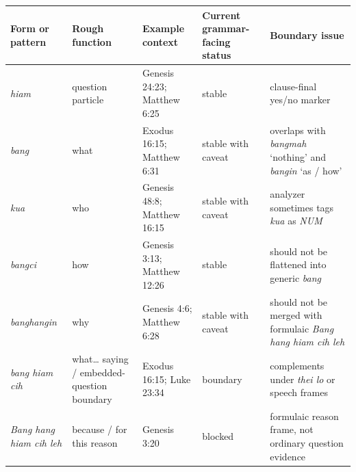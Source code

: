\documentclass[
  11pt,
  a4paper,
]{article}
\newcounter{none} %
\newcommand{\tdim}[1]{\textit{#1}}
\newcommand{\glossquote}[1]{`#1'}
\begin{document}
{\def\LTcaptype{none} %
\begin{longtable}[]{@{}
  >{\raggedright\arraybackslash}p{}
  >{\raggedright\arraybackslash}p{}
  >{\raggedright\arraybackslash}p{}
  >{\raggedright\arraybackslash}p{}
  >{\raggedright\arraybackslash}p{}@{}}
\toprule\noalign{}
\begin{minipage}[b]{\linewidth}\raggedright
Form or pattern
\end{minipage} & \begin{minipage}[b]{\linewidth}\raggedright
Rough function
\end{minipage} & \begin{minipage}[b]{\linewidth}\raggedright
Example context
\end{minipage} & \begin{minipage}[b]{\linewidth}\raggedright
Current grammar-facing status
\end{minipage} & \begin{minipage}[b]{\linewidth}\raggedright
Boundary issue
\end{minipage} \\
\midrule\noalign{}
\endhead
\bottomrule\noalign{}
\endlastfoot
\tdim{hiam} & question particle & Genesis 24:23; Matthew 6:25 & stable &
clause-final yes/no marker \\
\tdim{bang} & what & Exodus 16:15; Matthew 6:31 & stable with caveat &
overlaps with \tdim{bangmah} \glossquote{nothing} and \tdim{bangin}
\glossquote{as / how} \\
\tdim{kua} & who & Genesis 48:8; Matthew 16:15 & stable with caveat &
analyzer sometimes tags \tdim{kua} as \tdim{NUM} \\
\tdim{bangci} & how & Genesis 3:13; Matthew 12:26 & stable & should not
be flattened into generic \tdim{bang} \\
\tdim{banghangin} & why & Genesis 4:6; Matthew 6:28 & stable with caveat
& should not be merged with formulaic \tdim{Bang hang hiam cih leh} \\
\tdim{bang hiam cih} & what\ldots{} saying / embedded-question boundary
& Exodus 16:15; Luke 23:34 & boundary & complements under \tdim{thei lo}
or speech frames \\
\tdim{Bang hang hiam cih leh} & because / for this reason & Genesis 3:20
& blocked & formulaic reason frame, not ordinary question evidence \\

\end{longtable}}
\end{document}
